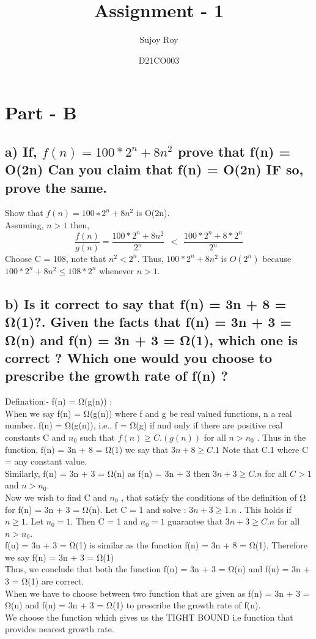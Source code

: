\documentclass[11pt]{article}
\title{Assignment - 1}
\author{Sujoy Roy}
\date{D21CO003}
\begin{document}
\maketitle

\section{Part - B}\label{section-Part-B}

\subsection{a)  If, $f(n) = 100 \ast 2^n + 8n^2$ prove that f(n) = O(2n) Can you claim that f(n) = O(2n) IF so, prove the same.}

Show that $f(n) = 100 ∗ 2^n + 8n^2$ is O(2n).\\
Assuming, $n > 1$ then, 
\[ \frac{f(n)}{g(n)}=\frac{100 \ast 2^n + 8n^2}{2^n} \ \ < 
	\ \ \frac{100 \ast 2^n + 8 \ast 2^n}{2^n} \]
Choose C = 108, note that $n^2 < 2^n$. Thus, $100 \ast 2^n + 8n^2$ is $O(2^n)$ because $100 \ast 2^n + 8n^2 \leq 108 \ast 2^n$ whenever $n > 1$.

\subsection{b) Is it correct to say that f(n) = 3n + 8 = Ω(1)?. Given the facts that f(n) = 3n + 3 = Ω(n) and f(n) = 3n + 3 = Ω(1), which one is
correct ? Which one would you choose to prescribe the growth rate
of f(n) ?}

Defination:- f(n) = Ω(g(n)) :\\
When we say f(n) = Ω(g(n)) where f and g be real valued functions, n a real
number. f(n) = Ω(g(n)), i.e., f = Ω(g) if and only if there are positive real constants C and $n_0$ such that $f(n) \geq {C.(g(n))}$ for all $n > n_0$ .
Thus in the function, f(n) = 3n + 8 = Ω(1) we say that $3n + 8 \geq {C.1}$ Note that C.1 where C = any constant value. \\
Similarly, f(n) = 3n + 3 = Ω(n) as f(n) = 3n + 3 then $3n + 3 \geq {C.n}$ for all $C > 1$ and $n > n_0$.\\
Now we wish to find C and $n_0$ , that satisfy the conditions of the definition of Ω for f(n) = 3n + 3 = Ω(n). Let C = 1 and solve : $3n + 3 \geq {1.n}$ . This holds if $n \geq {1}$. Let $n_0 = 1$. Then C = 1 and $n_0 = 1$ guarantee that $3n + 3 \geq {C.n}$ for all $n > n_0$.\\
f(n) = 3n + 3 = Ω(1) is similar as the function f(n) = 3n + 8 = Ω(1).
Therefore we say f(n) = 3n + 3 = Ω(1) \\
Thus, we conclude that both the function f(n) = 3n + 3 = Ω(n) and
f(n) = 3n + 3 = Ω(1) are correct.\\
When we have to choose between two function that are given as
f(n) = 3n + 3 = Ω(n) and f(n) = 3n + 3 = Ω(1) to prescribe the growth rate
of f(n). \\
We choose the function which gives us the TIGHT BOUND i.e function
that provides nearest growth rate.
\end{document}
